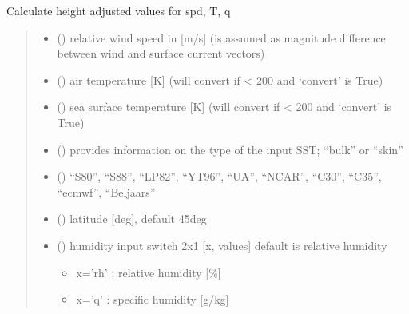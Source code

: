 \documentclass[letterpaper,10pt,english]{sphinxmanual}
\begin{document}
\begin{fulllineitems}
\sphinxAtStartPar
Calculate height adjusted values for spd, T, q
\begin{quote}\begin{description}
\begin{itemize}
\item {}
\sphinxAtStartPar
{} () \textendash{} relative wind speed in {[}m/s{]} (is assumed as magnitude difference
between wind and surface current vectors)

\item {}
\sphinxAtStartPar
{} () \textendash{} air temperature {[}K{]} (will convert if \textless{} 200 and ‘convert’ is True)

\item {}
\sphinxAtStartPar
{} () \textendash{} sea surface temperature {[}K{]} (will convert if \textless{} 200 and ‘convert’ is True)

\item {}
\sphinxAtStartPar
{} () \textendash{} provides information on the type of the input SST; “bulk” or “skin”

\item {}
\sphinxAtStartPar
{} () \textendash{} “S80”, “S88”, “LP82”, “YT96”, “UA”, “NCAR”, “C30”, “C35”, “ecmwf”, “Beljaars”

\item {}
\sphinxAtStartPar
{} () \textendash{} latitude {[}deg{]}, default 45deg

\item {}
\sphinxAtStartPar
{} () \textendash{}
\sphinxAtStartPar
humidity input switch 2x1 {[}x, values{]} default is relative humidity
\begin{itemize}
\item {}
\sphinxAtStartPar
x=’rh’ : relative humidity {[}\%{]}

\item {}
\sphinxAtStartPar
x=’q’ : specific humidity {[}g/kg{]}


\end{itemize}
\end{itemize}
\end{description}
\end{quote}
\end{fulllineitems}
\end{document}
